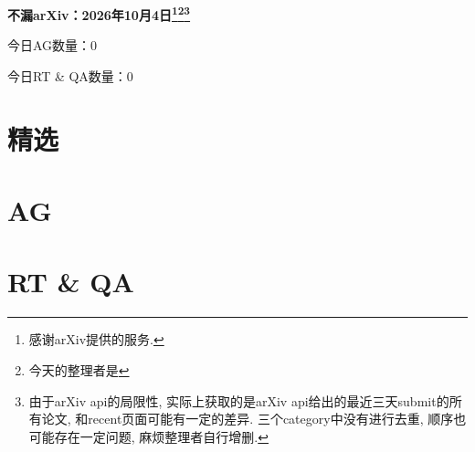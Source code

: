 \documentclass[9pt, a4paper]{article}
\theoremstyle{plain}
\theoremstyle{definition}
\theoremstyle{remark}
\newcommand{\AGnumber}{0}
\newcommand{\RTQAnumber}{0}
\newcommand{\NewestDate}{2026年10月4日}
\newcommand{\todayarXiver}{} %
\begin{document}
\begin{center}
    \Huge\textbf{不漏arXiv：\NewestDate\footnote{感谢arXiv提供的服务.}\footnote{今天的整理者是\todayarXiver}\footnote{由于arXiv api的局限性, 实际上获取的是arXiv api给出的最近三天submit的所有论文, 和recent页面可能有一定的差异. 三个category中没有进行去重, 顺序也可能存在一定问题, 麻烦整理者自行增删.}} \\
\end{center}

\setcounter{section}{-1}

\begin{center}
    今日AG数量：\AGnumber
    
    今日RT \& QA数量：\RTQAnumber
    
\end{center}


\section{精选}


\section{AG}

\section{RT \& QA}
\end{document}
